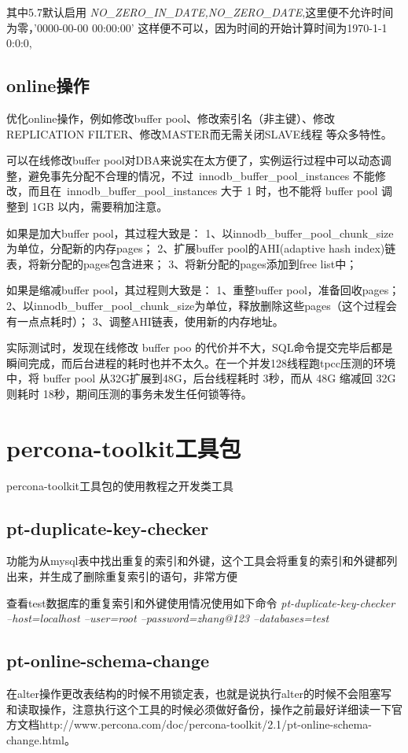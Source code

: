 其中5.7默认启用\textit{ NO_ZERO_IN_DATE,NO_ZERO_DATE},这里便不允许时间为零，'0000-00-00 00:00:00' 这样便不可以，因为时间的开始计算时间为1970-1-1 0:0:0,

\subsection{online操作}
优化online操作，例如修改buffer pool、修改索引名（非主键）、修改REPLICATION FILTER、修改MASTER而无需关闭SLAVE线程 等众多特性。

可以在线修改buffer pool对DBA来说实在太方便了，实例运行过程中可以动态调整，避免事先分配不合理的情况，不过 innodb_buffer_pool_instances 不能修改，而且在 innodb_buffer_pool_instances 大于 1 时，也不能将 buffer pool 调整到 1GB 以内，需要稍加注意。

如果是加大buffer pool，其过程大致是：
1、以innodb_buffer_pool_chunk_size为单位，分配新的内存pages；
2、扩展buffer pool的AHI(adaptive hash index)链表，将新分配的pages包含进来；
3、将新分配的pages添加到free list中；

如果是缩减buffer pool，其过程则大致是：
1、重整buffer pool，准备回收pages；
2、以innodb_buffer_pool_chunk_size为单位，释放删除这些pages（这个过程会有一点点耗时）；
3、调整AHI链表，使用新的内存地址。

实际测试时，发现在线修改 buffer poo 的代价并不大，SQL命令提交完毕后都是瞬间完成，而后台进程的耗时也并不太久。在一个并发128线程跑tpcc压测的环境中，将 buffer pool 从32G扩展到48G，后台线程耗时 3秒，而从 48G 缩减回 32G 则耗时 18秒，期间压测的事务未发生任何锁等待。

\section{percona-toolkit工具包}
 percona-toolkit工具包的使用教程之开发类工具
\subsection{pt-duplicate-key-checker}
功能为从mysql表中找出重复的索引和外键，这个工具会将重复的索引和外键都列出来，并生成了删除重复索引的语句，非常方便

查看test数据库的重复索引和外键使用情况使用如下命令
\textit{pt-duplicate-key-checker  --host=localhost --user=root --password=zhang@123  --databases=test}
        
\subsection{pt-online-schema-change}
在alter操作更改表结构的时候不用锁定表，也就是说执行alter的时候不会阻塞写和读取操作，注意执行这个工具的时候必须做好备份，操作之前最好详细读一下官方文档http://www.percona.com/doc/percona-toolkit/2.1/pt-online-schema-change.html。


